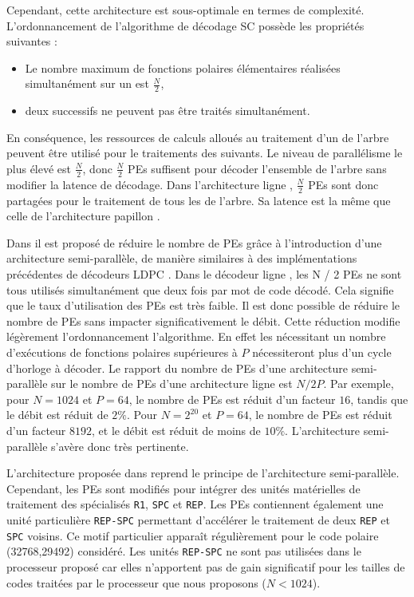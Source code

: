 Cependant, cette architecture est sous-optimale en termes de complexité.
L'ordonnancement de l'algorithme de décodage SC possède les propriétés suivantes :
\begin{itemize}
  \item Le nombre maximum de fonctions polaires élémentaires réalisées simultanément sur un \noeud est $\frac{N}{2}$,
  \item deux \noeuds successifs ne peuvent pas être traités simultanément.
\end{itemize}
En conséquence, les ressources de calculs alloués au traitement d'un \noeud de l'arbre peuvent être utilisé pour le traitements des \noeuds suivants.
Le niveau de parallélisme le plus élevé est $\frac{N}{2}$, donc $\frac{N}{2}$ PEs suffisent pour décoder l'ensemble de l'arbre sans modifier la latence de décodage.
Dans l'architecture \og ligne \fg, $\frac{N}{2}$ PEs sont donc partagées pour le traitement de tous les \noeuds de l'arbre. Sa latence est la même que celle de l'architecture \og papillon \fg.

Dans \cite{leroux_semi-parallel_2013} il est proposé de réduire le nombre de PEs grâce à l'introduction d'une architecture semi-parallèle, de manière similaires à des implémentations précédentes de décodeurs LDPC \cite{1049697}. Dans le décodeur \og ligne \fg, les N / 2 PEs ne sont tous utilisés simultanément que deux fois par mot de code décodé. Cela signifie que le taux d'utilisation des PEs est très faible. Il est donc possible de réduire le nombre de PEs sans impacter significativement le débit.
Cette réduction modifie légèrement l'ordonnancement l'algorithme. En effet les \noeuds nécessitant un nombre d'exécutions de fonctions polaires supérieures à $P$ nécessiteront plus d'un cycle d'horloge à décoder. Le rapport du nombre de PEs d'une architecture semi-parallèle sur le nombre de PEs d'une architecture \og ligne \fg est $N/2P$. Par exemple, pour $N=1024$ et $P=64$, le nombre de PEs est réduit d'un facteur $16$, tandis que le débit est réduit de $2\%$. Pour $N=2^{20}$ et $P=64$, le nombre de PEs est réduit d'un facteur $8192$, et le débit est réduit de moins de $10\%$. L'architecture semi-parallèle s'avère donc très pertinente.

L'architecture proposée dans \cite{sarkis_fast_2014} reprend le principe de l'architecture semi-parallèle. Cependant, les PEs sont modifiés pour intégrer des unités matérielles de traitement des \noeuds spécialisés \texttt{R1}, \texttt{SPC} et \texttt{REP}. Les PEs contiennent également une unité particulière \texttt{REP-SPC} permettant d’accélérer le traitement de deux \noeuds \texttt{REP} et \texttt{SPC} voisins. Ce motif particulier apparaît régulièrement pour le code polaire (32768,29492) considéré. Les unités \texttt{REP-SPC} ne sont pas utilisées dans le processeur proposé car elles n'apportent pas de gain significatif pour les tailles de codes traitées par le processeur que nous proposons ($N<1024$). 

